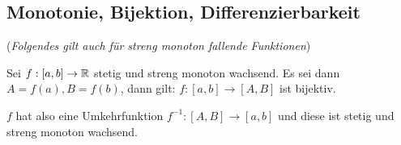 \subsection{Monotonie, Bijektion, Differenzierbarkeit}
\begin{satz}
(\textit{Folgendes gilt auch für streng monoton fallende Funktionen})

Sei $f: [a, b] \to \mathbb{R}$ stetig und streng monoton wachsend. Es sei dann
$A = f(a), B = f(b)$, dann gilt: $f: [a,b] \to [A, B]$ ist bijektiv.

$f$ hat also eine Umkehrfunktion $f^{-1}: [A,B] \to [a,b]$ und diese ist stetig
und streng monoton wachsend.
\end{satz}

